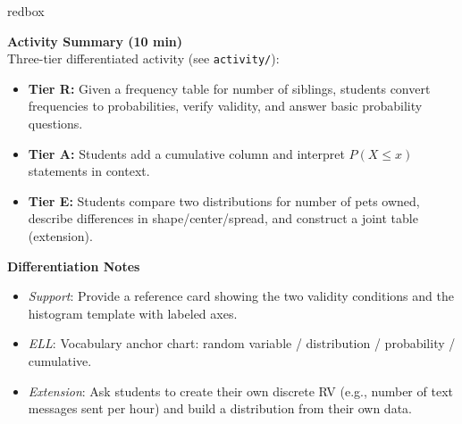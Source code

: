 \documentclass[10pt]{article}
\begin{document}
\begin{skillbox}{redbox}
\begin{minipage}[t]{0.48\linewidth}
    \textbf{Activity Summary (10 min)}\\
    Three-tier differentiated activity (see \texttt{activity/}):
    \begin{itemize}
        \item \textbf{Tier R:} Given a frequency table for number of siblings, students
              convert frequencies to probabilities, verify validity, and answer basic
              probability questions.
        \item \textbf{Tier A:} Students add a cumulative column and interpret $P(X \le x)$
              statements in context.
        \item \textbf{Tier E:} Students compare two distributions for number of pets
              owned, describe differences in shape/center/spread, and construct a joint
              table (extension).
    \end{itemize}
\end{minipage}
\hfill
\begin{minipage}[t]{0.48\linewidth}
    \textbf{Differentiation Notes}
    \begin{itemize}
        \item \textit{Support}: Provide a reference card showing the two validity conditions
              and the histogram template with labeled axes.
        \item \textit{ELL}: Vocabulary anchor chart: random variable / distribution /
              probability / cumulative.
        \item \textit{Extension}: Ask students to create their own discrete RV (e.g., number
              of text messages sent per hour) and build a distribution from their own data.
    \end{itemize}
\end{minipage}
\end{skillbox}
\end{document}
